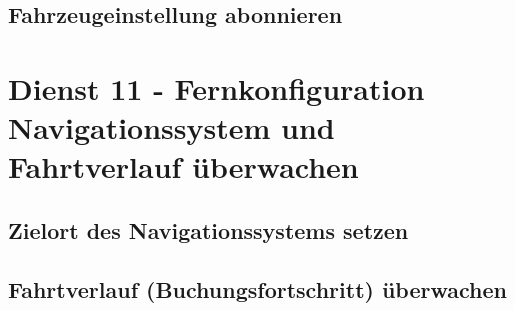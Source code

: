 \subsection*{Fahrzeugeinstellung abonnieren}
\label{subsec:Nachrichten:Dienst10:BookingSettingsSubscription}














\section{Dienst 11 - Fernkonfiguration Navigationssystem und Fahrtverlauf überwachen}
\label{sec:Nachrichten:Dienst11}

\subsection*{Zielort des Navigationssystems setzen}
\label{subsec:Nachrichten:Dienst11:SetNavigationDestination}





\subsection*{Fahrtverlauf (Buchungsfortschritt) überwachen}
\label{subsec:Nachrichten:Dienst11:BookingProgressSubscription}












